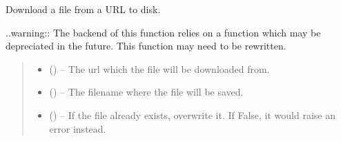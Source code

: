 \documentclass[letterpaper,11pt,english]{sphinxmanual}
\begin{document}
\begin{savenotes}\begin{fulllineitems}
\label{\detokenize{code/opihiexarata.library.http:opihiexarata.library.http.download_file_from_url}}
\pysigstartsignatures
{}
\pysigstopsignatures
\sphinxAtStartPar
Download a file from a URL to disk.

\sphinxAtStartPar
..warning:: The backend of this function relies on a function which may be
depreciated in the future. This function may need to be rewritten.
\begin{quote}\begin{description}
\begin{itemize}
\item {} 
\sphinxAtStartPar
{} () – The url which the file will be downloaded from.

\item {} 
\sphinxAtStartPar
{} () – The filename where the file will be saved.

\item {} 
\sphinxAtStartPar
{} (\sphinxstyleliteralemphasis{\sphinxupquote{, }}) – If the file already exists, overwrite it. If False, it would raise
an error instead.

\end{itemize}

\end{description}\end{quote}

\end{fulllineitems}\end{savenotes}

\end{document}
